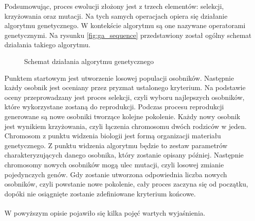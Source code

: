 \documentclass[twoside]{iisthesis}
\begin{document}
Podsumowując, proces ewolucji złożony jest z trzech elementów: selekcji, krzyżowania oraz mutacji\cite{ga_book}. Na tych samych operacjach opiera się działanie algorytmu genetycznego. W kontekście algorytmu są one nazywane operatorami genetycznymi. Na rysunku \eqref{fig:ga_sequence} przedstawiony został ogólny schemat działania takiego algorytmu.
\begin{figure}[!htb]
	\centering
	\caption{Schemat działania algorytmu genetycznego}
	\label{fig:ga_sequence}
\end{figure}

Punktem startowym jest utworzenie losowej populacji osobników. Następnie każdy osobnik jest oceniany przez pryzmat ustalonego kryterium. Na podstawie oceny przeprowadzany jest proces selekcji, czyli wyboru najlepszych osobników, które wykorzystane zostaną do reprodukcji. Podczas procesu reprodukcji generowane są nowe osobniki tworzące kolejne pokolenie. Każdy nowy osobnik jest wynikiem krzyżowania, czyli łączenia chromosomu dwóch rodziców w jeden. Chromosom z punktu widzenia biologii jest formą organizacji materiału genetycznego. Z punktu widzenia algorytmu będzie to zestaw parametrów charakteryzujących danego osobnika, który zostanie opisany później. Następnie chromosomy nowych osobników mogą ulec mutacji, czyli losowej zmianie pojedynczych genów. Gdy zostanie utworzona odpowiednia liczba nowych osobników, czyli powstanie nowe pokolenie, cały proces zaczyna się od początku, dopóki nie osiągnięte zostanie zdefiniowane kryterium końcowe.\\\\
W powyższym opisie pojawiło się kilka pojęć wartych wyjaśnienia.
\end{document}
